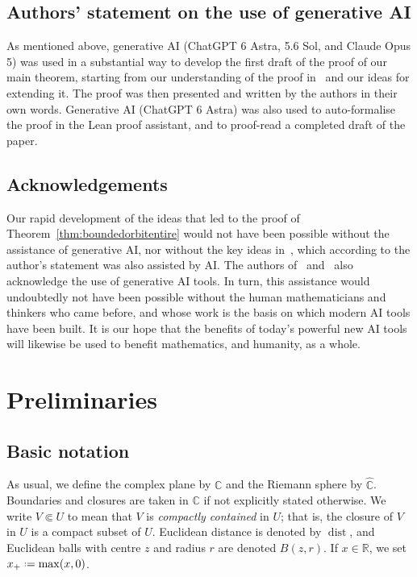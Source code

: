 \documentclass[12pt,a4paper,reqno]{amsart}
\theoremstyle{plain}
\theoremstyle{definition}
\theoremstyle{remark}
\newcommand{\dist}{\operatorname{dist}}
\numberwithin{equation}{section}
\newcommand \C{\mathbb{C}}
\newcommand \Ch{\widehat{\mathbb{C}}}
\newcommand \R{\mathbb{R}}
\newcommand*{\defeq}{\mathrel{\vcenter{\baselineskip0.5ex \lineskiplimit0pt
                     \hbox{\scriptsize.}\hbox{\scriptsize.}}}%
                     =}
\newcommand{\lr}[1]{{\color{magenta} #1}}
\begin{document}
\subsection*{Authors' statement on the use of generative AI}
 As mentioned above, generative AI (ChatGPT 6 Astra, 5.6 Sol, and Claude Opus 5) was used in a substantial way to develop the first draft of
  the proof of 
  our main theorem, starting from our understanding of the proof in~\cite{ye26} and our ideas
  for extending it. The proof was then presented and written by the authors in their 
  own words.
 Generative AI (ChatGPT 6 Astra) was
 also used to auto-formalise the proof
 in the Lean 
 proof assistant, and to proof-read
 a completed draft of the paper.

\subsection*{Acknowledgements}
 Our rapid development of the ideas that led to the proof of Theorem~\ref{thm:boundedorbitentire} 
  would not have been possible without the assistance of generative AI, nor without the 
  key ideas in~\cite{ye26}, which according to the author's statement was also assisted by
  AI. \lr{The authors of~\cite{drach-pardo-ucakar} and~\cite{ye26-2} also acknowledge the use of generative AI tools.}
  In turn, this assistance would undoubtedly not have been possible without the human mathematicians
  and thinkers who came before, and whose work is the basis on which modern AI tools
  have been built. It is our hope that the benefits of today's powerful new AI tools will
  likewise be used to benefit mathematics, and humanity, as a whole.

\section{Preliminaries} 

\subsection*{Basic notation}
As usual, we define the complex plane by $\C$ and
the Riemann sphere by $\Ch$. Boundaries and 
closures are taken in $\C$ if not explicitly
stated otherwise. We write 
 $V\Subset U$ to mean that
 $V$ is \emph{compactly contained} in $U$; that is,
 the closure of $V$ in $U$ is a compact subset of $U$.  
Euclidean distance is denoted by $\dist$, and
Euclidean balls with centre $z$ and radius $r$ 
are denoted $B(z,r)$.
If $x\in\R$, we set $x_+\defeq \max(x,0)$.
\end{document}
